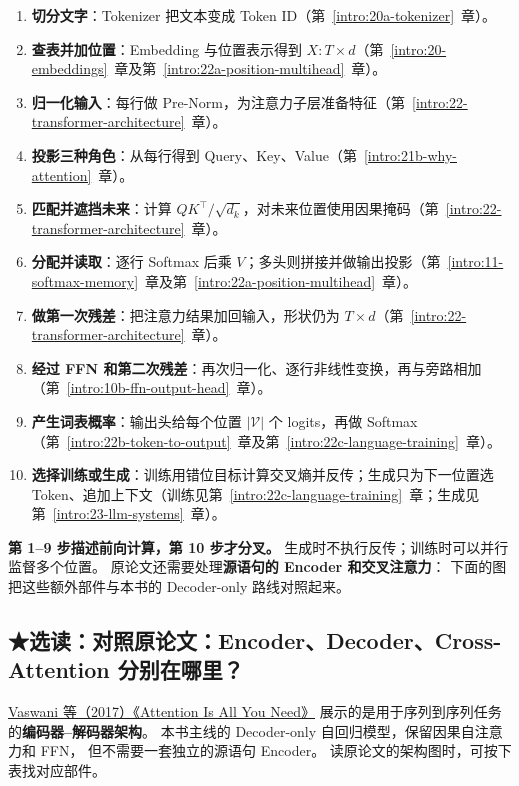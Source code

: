 \begin{enumerate}[leftmargin=2.3em,itemsep=2pt]
\item \textbf{切分文字}：Tokenizer 把文本变成 Token ID（第~\ref*{intro:20a-tokenizer}~章）。
\item \textbf{查表并加位置}：Embedding 与位置表示得到 $X:T\times d$（第~\ref*{intro:20-embeddings}~章及第~\ref*{intro:22a-position-multihead}~章）。
\item \textbf{归一化输入}：每行做 Pre-Norm，为注意力子层准备特征（第~\ref*{intro:22-transformer-architecture}~章）。
\item \textbf{投影三种角色}：从每行得到 Query、Key、Value（第~\ref*{intro:21b-why-attention}~章）。
\item \textbf{匹配并遮挡未来}：计算 $QK^\top/\sqrt{d_k}$，对未来位置使用因果掩码（第~\ref*{intro:22-transformer-architecture}~章）。
\item \textbf{分配并读取}：逐行 Softmax 后乘 $V$；多头则拼接并做输出投影（第~\ref*{intro:11-softmax-memory}~章及第~\ref*{intro:22a-position-multihead}~章）。
\item \textbf{做第一次残差}：把注意力结果加回输入，形状仍为 $T\times d$（第~\ref*{intro:22-transformer-architecture}~章）。
\item \textbf{经过 FFN 和第二次残差}：再次归一化、逐行非线性变换，再与旁路相加（第~\ref*{intro:10b-ffn-output-head}~章）。
\item \textbf{产生词表概率}：输出头给每个位置 $|\mathcal V|$ 个 logits，再做 Softmax（第~\ref*{intro:22b-token-to-output}~章及第~\ref*{intro:22c-language-training}~章）。
\item \textbf{选择训练或生成}：训练用错位目标计算交叉熵并反传；生成只为下一位置选 Token、追加上下文（训练见第~\ref*{intro:22c-language-training}~章；生成见第~\ref*{intro:23-llm-systems}~章）。
\end{enumerate}

\textbf{第 1--9 步描述前向计算，第 10 步才分叉。}
生成时不执行反传；训练时可以并行监督多个位置。
原论文还需要处理\textbf{源语句的 Encoder 和交叉注意力}：
下面的图把这些额外部件与本书的 Decoder-only 路线对照起来。


\subsection{\texorpdfstring{{\symboliconfont ★}}{★}选读：对照原论文：Encoder、Decoder、Cross-Attention 分别在哪里？}
\label{elective:original-paper}

\href{https://arxiv.org/abs/1706.03762}{Vaswani 等（2017）《Attention Is All You Need》}
展示的是用于序列到序列任务的\textbf{编码器--解码器架构}。
本书主线的 Decoder-only 自回归模型，保留因果自注意力和 FFN，
但不需要一套独立的源语句 Encoder。
读原论文的架构图时，可按下表找对应部件。

